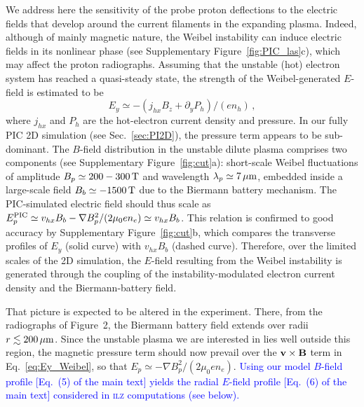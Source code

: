 \documentclass[aps,superscriptaddress]{revtex4}
\begin{document}
We address here the sensitivity of the probe proton deflections to the electric fields that develop around the current filaments in the expanding plasma. Indeed, although of mainly magnetic nature, the Weibel instability can induce electric fields in its nonlinear phase (see Supplementary Figure~\ref{fig:PIC_las}c), which may affect the proton radiographs. Assuming that the unstable (hot) electron system has reached a quasi-steady state, the strength of the Weibel-generated $E$-field is estimated to be
\begin{equation} \label{eq:Ey_Weibel}
    E_y \simeq - (j_{hx} B_z + \partial_y P_h)/(en_h) \,,
\end{equation}
where $j_{hx}$ and $P_h$ are the hot-electron current density and pressure.
In our fully PIC 2D simulation (see Sec.~\ref{sec:PI2D}), the pressure term appears to be sub-dominant. The $B$-field distribution in the unstable dilute plasma comprises two components (see Supplementary Figure~\ref{fig:cut}a): short-scale Weibel fluctuations of amplitude \textcolor{blue}{$B_p \simeq 200-300\,\rm T$} and wavelength $\lambda_p \simeq 7\,\rm \mu m$, embedded inside  a large-scale field $B_b \simeq -1500\,\rm T$ due to the Biermann battery mechanism. The PIC-simulated electric field should thus scale as $E_p^{\rm PIC} \simeq v_{hx} B_b -\nabla B_p^2/(2\mu_0 e n_e) \simeq v_{hx}B_b$. This relation is confirmed to good accuracy by Supplementary Figure~\ref{fig:cut}b, which compares the transverse profiles of $E_y$ (solid curve) with $v_{hx}B_b$ (dashed curve). Therefore, over the limited scales of the 2D simulation, the $E$-field resulting from the Weibel instability is generated through the coupling of the instability-modulated electron current density and the Biermann-battery field.

That picture is expected to be altered in the experiment. There, from the radiographs of Figure~2, the Biermann battery field extends over radii $r \lesssim 200\,\rm \mu m$. Since the unstable plasma we are interested in lies well outside this region, the magnetic pressure term should now prevail over the ${\bf v}\times {\bf B}$ term in Eq.~\eqref{eq:Ey_Weibel}, so that $E_p \simeq -\nabla B_p^2/(2\mu_0 e n_e)$. \textcolor{blue}{Using our model $B$-field profile [Eq.~(5) of the main text] yields the radial $E$-field profile [Eq.~(6) of the main text] considered in \textsc{ilz} computations (see below).}
\end{document}
